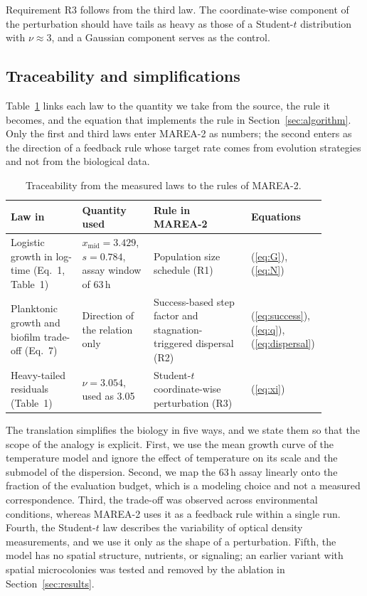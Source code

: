 \documentclass[preprint,12pt]{elsarticle}
\begin{document}
Requirement R3 follows from the third law. The coordinate-wise component of the
perturbation should have tails as heavy as those of a Student-$t$ distribution
with $\nu \approx 3$, and a Gaussian component serves as the control.

\subsection{Traceability and simplifications}
\label{sec:traceability}

Table~\ref{tab:traceability} links each law to the quantity we take from the
source, the rule it becomes, and the equation that implements the rule in
Section~\ref{sec:algorithm}. Only the first and third laws enter MAREA-2 as
numbers; the second enters as the direction of a feedback rule whose target
rate comes from evolution strategies and not from the biological data.

\begin{table}[t]
  \centering
  \caption{Traceability from the measured laws to the rules of MAREA-2.}
  \label{tab:traceability}
  \small
  \begin{tabular}{>{\raggedright\arraybackslash}p{0.22\linewidth}
                  >{\raggedright\arraybackslash}p{0.22\linewidth}
                  >{\raggedright\arraybackslash}p{0.30\linewidth}
                  >{\raggedright\arraybackslash}p{0.14\linewidth}}
    \toprule
    Law in~\cite{stehlik2025cobetia} & Quantity used & Rule in MAREA-2 & Equations \\
    \midrule
    Logistic growth in log-time (Eq.~1, Table~1)
      & $x_{\mathrm{mid}} = 3.429$, $s = 0.784$, assay window of 63\,h
      & Population size schedule (R1)
      & (\ref{eq:G}), (\ref{eq:N}) \\
    Planktonic growth and biofilm trade-off (Eq.~7)
      & Direction of the relation only
      & Success-based step factor and stagnation-triggered dispersal (R2)
      & (\ref{eq:success}), (\ref{eq:q}), (\ref{eq:dispersal}) \\
    Heavy-tailed residuals (Table~1)
      & $\nu = 3.054$, used as 3.05
      & Student-$t$ coordinate-wise perturbation (R3)
      & (\ref{eq:xi}) \\
    \bottomrule
  \end{tabular}
\end{table}

The translation simplifies the biology in five ways, and we state them so that
the scope of the analogy is explicit. First, we use the mean growth curve of
the temperature model and ignore the effect of temperature on its scale and
the submodel of the dispersion. Second, we map the 63\,h assay linearly onto
the fraction of the evaluation budget, which is a modeling choice and not a
measured correspondence. Third, the trade-off was observed across
environmental conditions, whereas MAREA-2 uses it as a feedback rule within a
single run. Fourth, the Student-$t$ law describes the variability of optical
density measurements, and we use it only as the shape of a perturbation.
Fifth, the model has no spatial structure, nutrients, or signaling; an earlier
variant with spatial microcolonies was tested and removed by the ablation in
Section~\ref{sec:results}.
\end{document}
